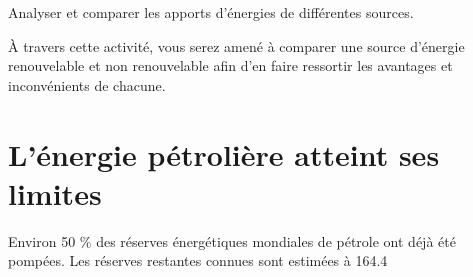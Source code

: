 \documentclass[10pt,fleqn]{article} %
\begin{document}
%

\begin{obj}
Analyser et comparer les apports d’énergies de différentes sources. 

À travers cette activité, vous serez amené à comparer une source
d’énergie renouvelable et non renouvelable afin d’en faire ressortir les
avantages et inconvénients de chacune.
\end{obj}
\section{L'énergie pétrolière atteint ses limites}
 Environ 50 \% des réserves énergétiques mondiales de pétrole ont déjà
été pompées. Les réserves restantes connues sont estimées à \SI{164.4}{
}
\end{document}
